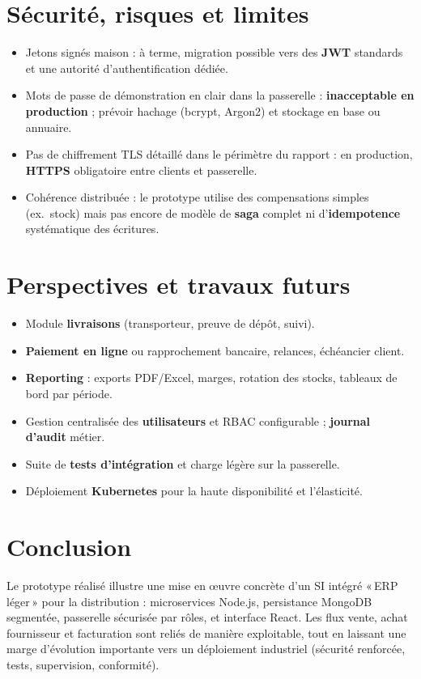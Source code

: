 \documentclass[11pt,a4paper]{article}
\begin{document}
\section{Sécurité, risques et limites}
\begin{itemize}[noitemsep]
  \item Jetons signés maison : à terme, migration possible vers des \textbf{JWT} standards et une autorité d'authentification dédiée.
  \item Mots de passe de démonstration en clair dans la passerelle : \textbf{inacceptable en production} ; prévoir hachage (bcrypt, Argon2) et stockage en base ou annuaire.
  \item Pas de chiffrement TLS détaillé dans le périmètre du rapport : en production, \textbf{HTTPS} obligatoire entre clients et passerelle.
  \item Cohérence distribuée : le prototype utilise des compensations simples (ex.\ stock) mais pas encore de modèle de \textbf{saga} complet ni d'\textbf{idempotence} systématique des écritures.
\end{itemize}

\section{Perspectives et travaux futurs}
\begin{itemize}[noitemsep]
  \item Module \textbf{livraisons} (transporteur, preuve de dépôt, suivi).
  \item \textbf{Paiement en ligne} ou rapprochement bancaire, relances, échéancier client.
  \item \textbf{Reporting} : exports PDF/Excel, marges, rotation des stocks, tableaux de bord par période.
  \item Gestion centralisée des \textbf{utilisateurs} et RBAC configurable ; \textbf{journal d'audit} métier.
  \item Suite de \textbf{tests d'intégration} et charge légère sur la passerelle.
  \item Déploiement \textbf{Kubernetes} pour la haute disponibilité et l'élasticité.
\end{itemize}

\section{Conclusion}
Le prototype réalisé illustre une mise en œuvre concrète d'un SI intégré «\,ERP léger\,» pour la distribution : microservices Node.js, persistance MongoDB segmentée, passerelle sécurisée par rôles, et interface React. Les flux vente, achat fournisseur et facturation sont reliés de manière exploitable, tout en laissant une marge d'évolution importante vers un déploiement industriel (sécurité renforcée, tests, supervision, conformité).
\end{document}
